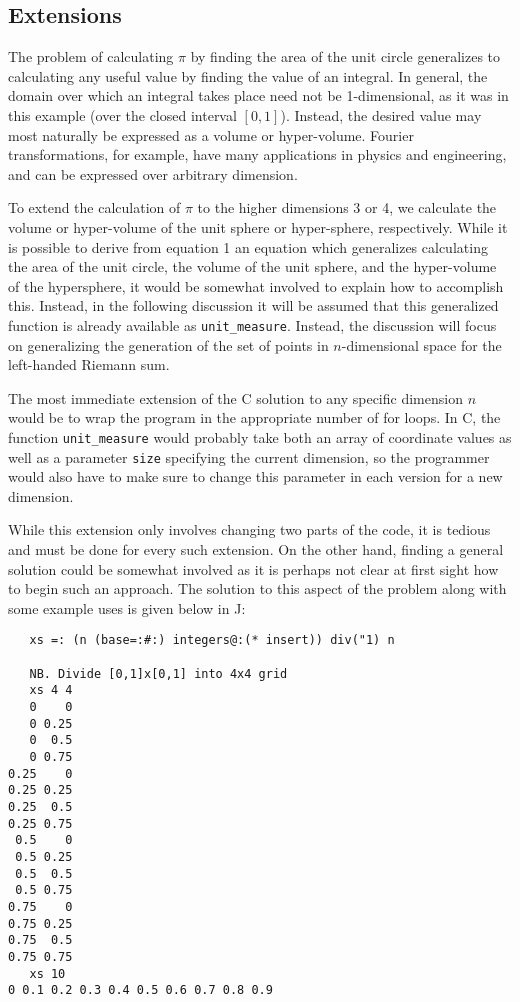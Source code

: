 \subsection{Extensions}
\label{piext}
The problem of calculating $\pi$ by finding the area of the unit circle 
generalizes to calculating any useful value by finding the value of an integral. 
In general, the domain over which an integral takes place need not be 1-dimensional, 
as it was in this example (over the closed interval $[0,1]$).
Instead, the desired value may most naturally be expressed as a volume or hyper-volume. 
Fourier transformations, for example, have many applications in physics and engineering, 
and can be expressed over arbitrary dimension.

To extend the calculation of $\pi$ to the higher dimensions 3 or 4, 
we calculate the volume or hyper-volume of the unit sphere or hyper-sphere, respectively. 
While it is possible to derive from equation 1 %
an equation which generalizes calculating the area of the unit circle, 
the volume of the unit sphere, and the hyper-volume of the hypersphere, 
it would be somewhat involved to explain how to accomplish this. 
Instead, in the following discussion it will be assumed 
that this generalized function is already available as \texttt{unit\_measure}.
Instead, the discussion will focus on generalizing the generation of 
the set of points in $n$-dimensional space for the left-handed Riemann sum.

The most immediate extension of the C solution to any specific dimension $n$
would be to wrap the program in the appropriate number of for loops. 
In C, the function \texttt{unit\_measure} would probably take both 
an array of coordinate values as well as a parameter \texttt{size} specifying the current dimension, 
so the programmer would also have to make sure to change this parameter in each version for a new dimension.

While this extension only involves changing two parts of the code, it is tedious 
and must be done for every such extension. 
On the other hand, finding a general solution could be somewhat involved 
as it is perhaps not clear at first sight how to begin such an approach.
The solution to this aspect of the problem along with some example uses is given below in J:

\begin{singlespacing}
\begin{small}
\begin{verbatim}
   xs =: (n (base=:#:) integers@:(* insert)) div("1) n

   NB. Divide [0,1]x[0,1] into 4x4 grid
   xs 4 4
   0    0
   0 0.25
   0  0.5
   0 0.75
0.25    0
0.25 0.25
0.25  0.5
0.25 0.75
 0.5    0
 0.5 0.25
 0.5  0.5
 0.5 0.75
0.75    0
0.75 0.25
0.75  0.5
0.75 0.75
   xs 10
0 0.1 0.2 0.3 0.4 0.5 0.6 0.7 0.8 0.9
\end{verbatim}
\end{small}
\end{singlespacing}

